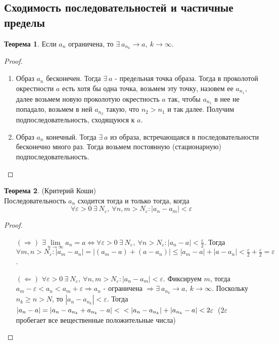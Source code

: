\documentclass[a4paper, 12pt]{article}
\renewcommand{\epsilon}{\varepsilon}
\newcommand\tab[1][.5cm]{\hspace*{#1}}
\newcommand{\lims}{\lim\limits_{n\to \infty}}
\theoremstyle{definition}
\newtheorem*{theorem}{Теорема}
\begin{document}
    \subsection{Сходимость последовательностей и частичные пределы}
        \begin{theorem}
            Если $a_n$ ограничена, то $\exists\ a_{n_k}\to a,\ k\to \infty$. 
        \end{theorem}
        \begin{proof}\tab
            \begin{enumerate}
                \item Образ $a_n$ бесконечен. Тогда $\exists\ a$ - предельная точка образа. Тогда в проколотой окрестности $a$ есть хотя бы одна точка, возьмем эту точку, назовем ее $a_{n_1}$, далее возьмем новую проколотую окрестность $a$ так, чтобы $a_{n_1}$ в нее не попадало, возьмем в ней $a_{n_2}$ такую, что $n_2>n_1$ и так далее. Получим подпоследовательность, сходящуюся к $a$. 
                \item Образ $a_n$ конечный. Тогда $\exists\ a$ из образа, встречающаяся в последовательности бесконечно много раз. Тогда возьмем постоянную (стационарную) подпоследовательность.
            \end{enumerate}
        \end{proof} 
        \begin{theorem} (Критерий Коши)\\
            Последовательность $a_n$ сходится тогда и только тогда, когда
            \[\forall \epsilon>0\ \exists\ N_{\epsilon},\ \forall n,m>N_{\epsilon}: |a_n-a_m|<\epsilon\]
        \end{theorem} 
        \begin{proof}\tab
            \begin{itemize}
                \item[$(\Rightarrow)$] $\exists \lims a_n =a \Leftrightarrow \forall \epsilon>0\ \exists\ N_{\epsilon},\ \forall n>N_{\epsilon}: |a_n-a|<\frac{\epsilon}{2}$. Тогда $\forall m,n>N_{\epsilon}: |a_m-a_n|=|(a_m-a)+(a-a_n)|\leq |a_m-a|+|a-a_n|<\frac{\epsilon}{2}+\frac{\epsilon}{2}=\epsilon$. 
                \item[$(\Leftarrow)$] $\forall \epsilon>0\ \exists\ N_{\epsilon},\ \forall n,m>N_{\epsilon}: |a_n-a_m|<\epsilon$. Фиксируем $m$, тогда\\ $a_m-\epsilon<a_n<a_m+\epsilon \Rightarrow a_n$ - ограничена $\Rightarrow \exists\ a_{n_k}\to a,\ k\to \infty$. Поскольку $n_k\geq n > N$, то $|a_n-a_{n_k}|<\epsilon$. Тогда $|a_n-a|=|a_n-a_{n_k}+a_{n_k}-a|<\\<|a_n-a_{n_k}|+|a_{n_k}-a|<2\epsilon$\ ($2\epsilon$ пробегает все вещественные положительные числа) 
            \end{itemize}
        \end{proof} 
\end{document}
